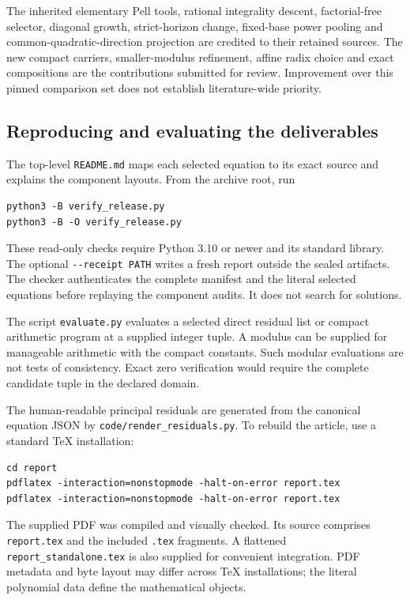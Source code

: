 \documentclass[11pt]{article}
\theoremstyle{remark}\newtheorem{remark}[theorem]{Remark}
\newcommand{\file}[1]{\nolinkurl{#1}}
\begin{document}
The inherited elementary Pell tools, rational integrality descent,
factorial-free selector, diagonal growth, strict-horizon change,
fixed-base power pooling and common-quadratic-direction projection
are credited to their retained sources. The new compact carriers,
smaller-modulus refinement, affine radix choice and exact compositions
are the contributions submitted for review. Improvement over this
pinned comparison set does not establish literature-wide priority.

\subsection{Reproducing and evaluating the deliverables}

The top-level \file{README.md} maps each selected equation to its exact
source and explains the component layouts. From the archive root,
run
\begin{verbatim}
python3 -B verify_release.py
python3 -B -O verify_release.py
\end{verbatim}
These read-only checks require Python 3.10 or newer and its standard
library. The optional \file{--receipt PATH} writes a fresh report
outside the sealed artifacts. The checker authenticates the complete
manifest and the literal selected equations before replaying the
component audits. It does not search for solutions.

The script \file{evaluate.py} evaluates a selected direct residual list
or compact arithmetic program at a supplied integer tuple. A modulus
can be supplied for manageable arithmetic with the compact constants.
Such modular evaluations are not tests of consistency. Exact zero
verification would require the complete candidate tuple in the declared
domain.

The human-readable principal residuals are generated from the canonical
equation JSON by \file{code/render_residuals.py}. To rebuild the article,
use a standard TeX installation:
\begin{verbatim}
cd report
pdflatex -interaction=nonstopmode -halt-on-error report.tex
pdflatex -interaction=nonstopmode -halt-on-error report.tex
\end{verbatim}
The supplied PDF was compiled and visually checked. Its source comprises
\file{report.tex} and the included \file{.tex} fragments. A flattened
\file{report_standalone.tex} is also supplied for convenient integration.
PDF metadata and byte layout may differ across TeX installations;
the literal polynomial data define the mathematical objects.
\end{document}
